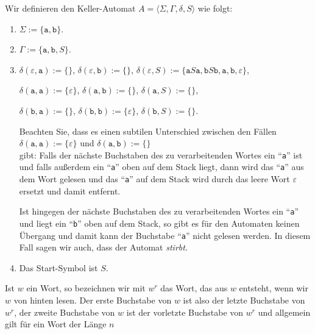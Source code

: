 \example
Wir definieren den Keller-Automat $A = \langle \Sigma, \Gamma, \delta, S \rangle$ wie
folgt:
\begin{enumerate}
\item $\Sigma := \{ \texttt{a}, \texttt{b} \}$.
\item $\Gamma := \{ \texttt{a}, \texttt{b}, S \}$.
\item $\delta(\varepsilon, \texttt{a}) := \{ \}$, \quad 
      $\delta(\varepsilon, \texttt{b}) := \{ \}$, \quad
      $\delta(\varepsilon, S) := \{ \texttt{a}S\texttt{a}, \texttt{b}S\texttt{b}, \texttt{a}, \texttt{b}, \varepsilon \}$,

      $\delta(\texttt{a}, \texttt{a}) := \{ \varepsilon \}$, \quad
      $\delta(\texttt{a}, \texttt{b}) := \{ \}$, \quad
      $\delta(\texttt{a}, S) := \{ \}$, 

      $\delta(\texttt{b}, \texttt{a}) := \{ \}$, \quad
      $\delta(\texttt{b}, \texttt{b}) := \{ \varepsilon \}$, \quad
      $\delta(\texttt{b}, S) := \{ \}$.

      Beachten Sie, dass es einen subtilen Unterschied zwischen den F\"allen
      \\[0.2cm]
      \hspace*{1.3cm}
      $\delta(\texttt{a}, \texttt{a}) := \{ \varepsilon \}$ \quad und \quad
      $\delta(\texttt{a}, \texttt{b}) := \{ \}$
      \\[0.2cm]
      gibt:  Falls der n\"achste Buchstaben des zu verarbeitenden Wortes ein ``\texttt{a}''
      ist und falls au{\ss}erdem ein ``\texttt{a}'' oben auf 
      dem Stack liegt, dann wird das ``\texttt{a}'' aus dem Wort gelesen und 
      das ``\texttt{a}'' auf dem Stack wird durch das leere Wort $\varepsilon$ ersetzt 
      und damit entfernt. 
      
      Ist hingegen  der n\"achste Buchstaben des zu verarbeitenden Wortes ein ``\texttt{a}''
      und liegt  ein ``\texttt{b}'' oben auf dem Stack, so gibt es f\"ur den Automaten
      keinen \"Ubergang und damit kann der Buchstabe ``\texttt{a}'' nicht gelesen werden.
      In diesem Fall sagen wir auch, dass der Automat \emph{stirbt}.
\item Das Start-Symbol ist $S$.
\end{enumerate}
Ist $w$ ein Wort, so bezeichnen wir mit $w^r$ das
Wort, das aus $w$ entsteht, wenn wir $w$ von hinten lesen.  Der erste Buchstabe von $w$
ist also der letzte Buchstabe von $w^r$, der zweite Buchstabe von $w$ ist der vorletzte
Buchstabe von $w^r$ und allgemein gilt f\"ur ein Wort der L\"ange $n$
\\[0.2cm]
